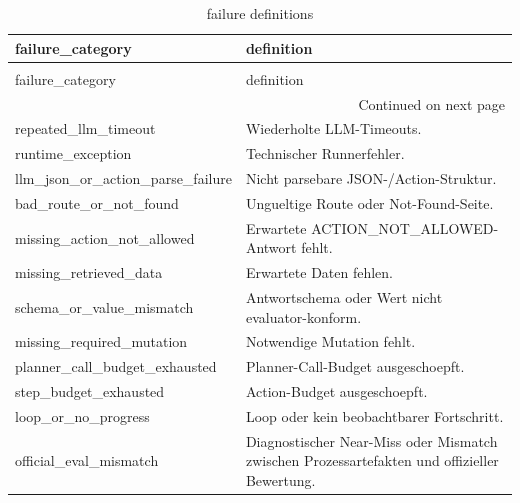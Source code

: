 \begin{longtable}{ll}
\caption{failure definitions} \label{tab:failure_definitions} \\
\toprule
failure\_category & definition \\
\midrule
\endfirsthead
\caption[]{failure definitions} \\
\toprule
failure\_category & definition \\
\midrule
\endhead
\midrule
\multicolumn{2}{r}{Continued on next page} \\
\midrule
\endfoot
\bottomrule
\endlastfoot
repeated\_llm\_timeout & Wiederholte LLM-Timeouts. \\
runtime\_exception & Technischer Runnerfehler. \\
llm\_json\_or\_action\_parse\_failure & Nicht parsebare JSON-/Action-Struktur. \\
bad\_route\_or\_not\_found & Ungueltige Route oder Not-Found-Seite. \\
missing\_action\_not\_allowed & Erwartete ACTION\_NOT\_ALLOWED-Antwort fehlt. \\
missing\_retrieved\_data & Erwartete Daten fehlen. \\
schema\_or\_value\_mismatch & Antwortschema oder Wert nicht evaluator-konform. \\
missing\_required\_mutation & Notwendige Mutation fehlt. \\
planner\_call\_budget\_exhausted & Planner-Call-Budget ausgeschoepft. \\
step\_budget\_exhausted & Action-Budget ausgeschoepft. \\
loop\_or\_no\_progress & Loop oder kein beobachtbarer Fortschritt. \\
official\_eval\_mismatch & Diagnostischer Near-Miss oder Mismatch zwischen Prozessartefakten und offizieller Bewertung. \\
\end{longtable}
